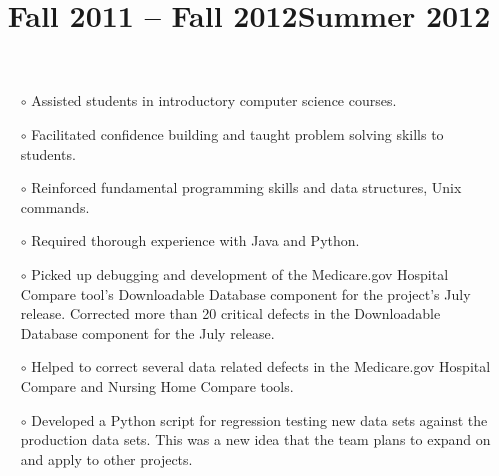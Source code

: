 \begin{resume}
\title{Fall 2011 -- Fall 2012}
\begin{position}
\vspace{-10pt}
\begin{itemize}\setlength{\itemsep}{-0.5mm}
\item[$\circ$] Assisted students in introductory computer science courses. 
\item[$\circ$] Facilitated confidence building and taught problem solving skills to students. 
\item[$\circ$] Reinforced fundamental programming skills and data structures, Unix commands.
\item[$\circ$] Required thorough experience with Java and Python.
\end{itemize}
\end{position}

\title{Summer 2012}
\begin{position}
\vspace{-10pt}
\begin{itemize}\setlength{\itemsep}{-0.5mm}
\item[$\circ$] Picked up debugging and development of the Medicare.gov Hospital Compare tool's Downloadable Database component for the project's July release. Corrected more than 20 critical defects in the Downloadable Database component for the July release.
\item[$\circ$] Helped to correct several data related defects in the Medicare.gov Hospital Compare and Nursing Home Compare tools.
\item[$\circ$] Developed a Python script for regression testing new data sets against the production data sets. This was a new idea that the team plans to expand on and apply to other projects.
\end{itemize}
\end{position}


\end{resume}

